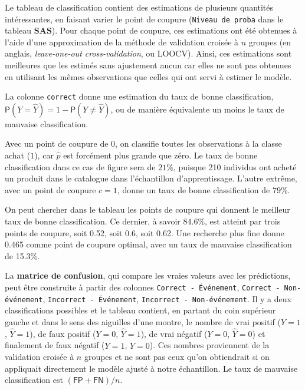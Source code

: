 \documentclass[
  11pt,
  letterpaper,
]{book}
\theoremstyle{definition}
\theoremstyle{definition}
\theoremstyle{definition}
\theoremstyle{remark}
\begin{document}
Le tableau de classification contient des estimations de plusieurs quantités intéressantes, en faisant varier le point de coupure (\texttt{Niveau\ de\ proba} dans le tableau \textbf{SAS}). Pour chaque point de coupure, ces estimations ont été obtenues à l'aide d'une approximation de la méthode de validation croisée à \(n\) groupes (en anglais, \emph{leave-one-out cross-validation}, ou LOOCV). Ainsi, ces estimations sont meilleures que les estimés sans ajustement aucun car elles ne sont pas obtenues en utilisant les mêmes observations que celles qui ont servi à estimer le modèle.

La colonne \texttt{correct} donne une estimation du taux de bonne classification, \({\mathsf P}\left(Y = \widehat{Y}\right) = 1-{\mathsf P}\left(Y \neq \widehat{Y}\right)\), ou de manière équivalente un moins le taux de mauvaise classification.

Avec un point de coupure de \(0\), on classifie toutes les observations à la classe achat (\(1\)), car \(\widehat{p}\) est forcément plus grande que zéro. Le taux de bonne classification dans ce cas de figure sera de \(21\)\%, puisque 210 individus ont acheté un produit dans le catalogue dans l'échantillon d'apprentissage.
L'autre extrême, avec un point de coupure \(c=1\), donne un taux de bonne classification de \(79\)\%.

On peut chercher dans le tableau les points de coupure qui donnent le meilleur taux de bonne classification. Ce dernier, à savoir 84.6\%, est atteint par trois points de coupure, soit 0.52, soit 0.6, soit 0.62. Une recherche plus fine donne 0.465 comme point de coupure optimal, avec un taux de mauvaise classification de 15.3\%.

La \textbf{matrice de confusion}, qui compare les vraies valeurs avec les prédictions, peut être construite à partir des colonnes \texttt{Correct\ -\ Événement}, \texttt{Correct\ -\ Non-événement}, \texttt{Incorrect\ -\ Événement}, \texttt{Incorrect\ -\ Non-événement}. Il y a deux classifications possibles et le tableau contient, en partant du coin supérieur gauche et dans le sens des aiguilles d'une montre, le nombre de vrai positif (\(Y=1\), \(\widehat{Y}=1\)), de faux positif (\(Y=0\), \(\widehat{Y}=1\)), de vrai négatif (\(Y=0\), \(\widehat{Y}=0\)) et finalement de faux négatif (\(Y=1\), \(\widehat{Y}=0\)). Ces nombres proviennent de la validation croisée à \(n\) groupes et ne sont pas ceux qu'on obtiendrait si on appliquait directement le modèle ajusté à notre échantillon. Le taux de mauvaise classification est \((\mathsf{FP}+\mathsf{FN})/n\).
\end{document}
